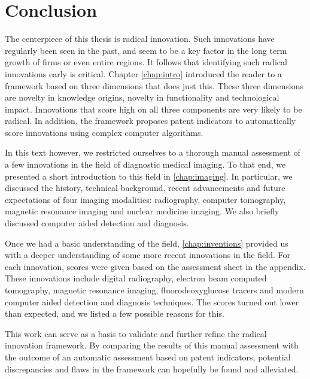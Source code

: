 \chapter{Conclusion}\label{chap:conclusions}
The centerpiece of this thesis is radical innovation. Such innovations have
regularly been seen in the past, and seem to be a key factor in the long term
growth of firms or even entire regions. It follows that identifying such radical
innovations early is critical. Chapter \ref{chap:intro} introduced the reader to
a framework based on three dimensions that does just this. These three
dimensions are novelty in knowledge origins, novelty in functionality
and technological impact. Innovations that score high on all three components
are very likely to be radical. In addition, the framework proposes patent
indicators to automatically score innovations using complex computer algorithms.

In this text however, we restricted ourselves to a thorough manual assessment of
a few innovations in the field of diagnostic medical imaging. To that end, we
presented a short introduction to this field in \autoref{chap:imaging}. In
particular, we discussed the history, technical background, recent advancements
and future expectations of four imaging modalities: radiography, computer
tomography, magnetic resonance imaging and nuclear medicine imaging. We also
briefly discussed computer aided detection and diagnosis.

Once we had a basic understanding of the field, \autoref{chap:inventions}
provided us with a deeper understanding of some more recent innovations in the
field. For each innovation, scores were given based on the assessment sheet in
the appendix. These innovations include digital radiography, electron beam
computed tomography, magnetic resonance imaging, fluorodeoxyglucose tracers and
modern computer aided detection and diagnosis techniques. The scores turned out
lower than expected, and we listed a few possible reasons for this.

This work can serve as a basis to validate and further refine the radical
innovation framework. By comparing the results of this manual assessment with
the outcome of an automatic assessment based on patent indicators, potential
discrepancies and flaws in the framework can hopefully be found and alleviated.